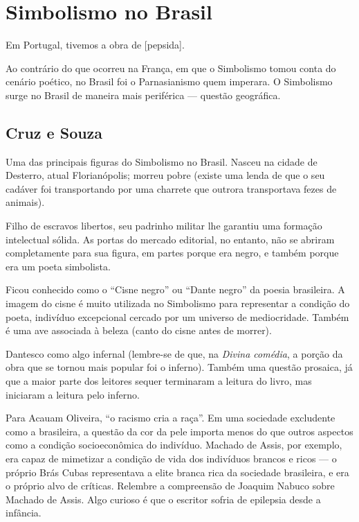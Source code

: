 
\chapter{Simbolismo no Brasil}

Em Portugal, tivemos a obra de [pepsida].

Ao contrário do que ocorreu na França, em que o Simbolismo tomou conta do cenário poético, no Brasil foi o Parnasianismo quem imperara. O Simbolismo surge no Brasil de maneira mais periférica — questão geográfica.

\section{Cruz e Souza}

Uma das principais figuras do Simbolismo no Brasil. Nasceu na cidade de Desterro, atual Florianópolis; morreu pobre (existe uma lenda de que o seu cadáver foi transportando por uma charrete que outrora transportava fezes de animais).

Filho de escravos libertos, seu padrinho militar lhe garantiu uma formação intelectual sólida. As portas do mercado editorial, no entanto, não se abriram completamente para sua figura, em partes porque era negro, e também porque era um poeta simbolista.

Ficou conhecido como o ``Cisne negro'' ou ``Dante negro'' da poesia brasileira. A imagem do cisne é muito utilizada no Simbolismo para representar a condição do poeta, indivíduo excepcional cercado por um universo de mediocridade. Também é uma ave associada à beleza (canto do cisne antes de morrer).

Dantesco como algo infernal (lembre-se de que, na \textit{Divina comédia}, a porção da obra que se tornou mais popular foi o inferno). Também uma questão prosaica, já que a maior parte dos leitores sequer terminaram a leitura do livro, mas iniciaram a leitura pelo inferno.

Para Acauam Oliveira, ``o racismo cria a raça''. Em uma sociedade excludente como a brasileira, a questão da cor da pele importa menos do que outros aspectos como a condição socioeconômica do indivíduo. Machado de Assis, por exemplo, era capaz de mimetizar a condição de vida dos indivíduos brancos e ricos — o próprio Brás Cubas representava a elite branca rica da sociedade brasileira, e era o próprio alvo de críticas. Relembre a compreensão de Joaquim Nabuco sobre Machado de Assis. Algo curioso é que o escritor sofria de epilepsia desde a infância.

